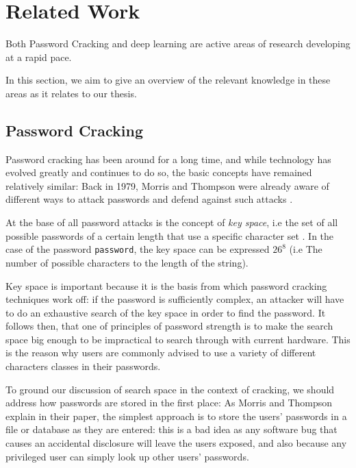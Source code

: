 \setcounter{secnumdepth}{4}
\setcounter{tocdepth}{4}

\section{Related Work}\label{sec:related_work}
Both Password Cracking and deep learning are active areas of research developing at a rapid pace.

In this section, we aim to give an overview of the relevant knowledge in these areas as it relates to our thesis.

\subsection{Password Cracking}
Password cracking has been around for a long time, and while technology has evolved greatly and continues to do so, the basic concepts have remained relatively similar:
Back in 1979, Morris and Thompson were already aware of different ways to attack passwords and defend against such attacks \cite{Thompson1979}.

At the base of all password attacks is the concept of \emph{key space}, i.e the set of all possible passwords of a certain length that use a specific character set \cite{Thompson1979,hash_cat_mask_attack}. 
In the case of the password \texttt{password}, the key space can be expressed $26^8$ (i.e The number of possible characters to the length of the string).

Key space is important because it is the basis from which password cracking techniques work off: if the password is sufficiently complex, an attacker will have to do an exhaustive search of the key space in order to find the password. 
It follows then, that one of principles of password strength is to make the search space big enough to be impractical to search through with current hardware.
This is the reason why users are commonly advised to use a variety of different characters classes in their passwords.

To ground our discussion of search space in the context of cracking, we should address how passwords are stored in the first place: As Morris and Thompson explain in their paper, the simplest approach is to store the users' passwords in a file or database as they are entered: this is a bad idea as any software bug that causes an accidental disclosure will leave the users exposed, and also because any privileged user can simply look up other users' passwords.


